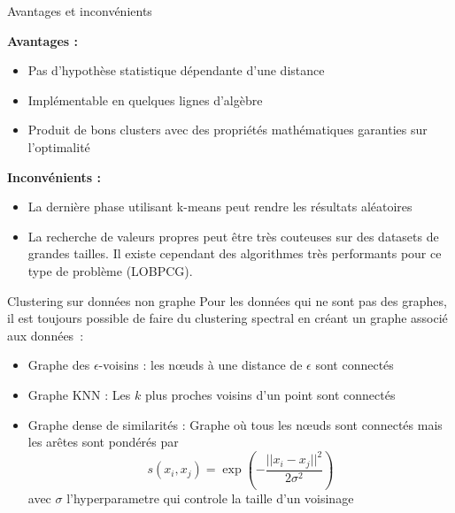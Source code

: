 \begin{frame}{Avantages et inconvénients}
    \begin{minipage}[t]{0.49\linewidth}
        \textbf{Avantages : }
        \begin{itemize}
            \item Pas d'hypothèse statistique dépendante d'une distance
            \item Implémentable en quelques lignes d'algèbre
            \item Produit de bons clusters avec des propriétés mathématiques garanties sur l'optimalité
        \end{itemize}
    \end{minipage}
    \begin{minipage}[t]{0.49\linewidth}
        \textbf{Inconvénients : }
        \begin{itemize}
            \item La dernière phase utilisant k-means peut rendre les résultats aléatoires
            \item La recherche de valeurs propres peut être très couteuses sur des datasets de grandes tailles. Il existe cependant des algorithmes très performants pour ce type de problème (LOBPCG).
        \end{itemize}
    \end{minipage}
\end{frame}

\begin{frame}{Clustering sur données non graphe}
    Pour les données qui ne sont pas des graphes, il est toujours possible de faire du clustering spectral en créant un graphe associé aux données~:
    \begin{itemize}
        \item Graphe des $\epsilon$-voisins : les nœuds à une distance de $\epsilon$ sont connectés
        \item Graphe KNN : Les $k$ plus proches voisins d'un point sont connectés
        \item Graphe dense de similarités : Graphe où tous les nœuds sont connectés mais les arêtes sont pondérés par 
        $$
            s(x_i,x_j) = \exp \left( -\frac{||x_i-x_j||^2}{2\sigma^2} \right)
        $$
        avec $\sigma$ l'hyperparametre qui controle la taille d'un \og voisinage \fg{}
    \end{itemize}
\end{frame}